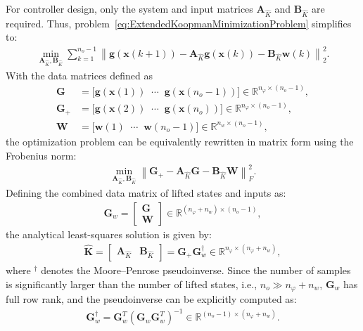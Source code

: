 For controller design, only the system and input matrices $\bm{A}_{\hat{K}}$ and $\bm{B}_{\hat{K}}$ are required. Thus, problem~\eqref{eq:ExtendedKoopmanMinimizationProblem} simplifies to:
\begin{align}
    \min_{\bm{A}_{\hat{K}}, \bm{B}_{\hat{K}}} 
    \sum_{k=1}^{n_o-1} 
    \left\| \bm{g}(\bm{x}(k+1)) - \bm{A}_{\hat{K}} \bm{g}(\bm{x}(k)) - \bm{B}_{\hat{K}} \bm{w}(k) \right\|_2^2.
    \label{eq:ApproxKoopman}
\end{align}
%
With the data matrices defined as
\begin{align}\label{eq:G_Gplus_datamatrices}
    \bm{G} &= \bigl[ \bm{g}(\bm{x}(1)) \;\; \cdots \;\; \bm{g}(\bm{x}(n_o-1)) \bigr] \in \mathbb{R}^{n_\varphi \times (n_o-1)}, \\
    \bm{G}_{+} &= \bigl[ \bm{g}(\bm{x}(2)) \;\; \cdots \;\; \bm{g}(\bm{x}(n_o)) \bigr] \in \mathbb{R}^{n_\varphi \times (n_o-1)}, \\
    \bm{W} &= \bigl[ \bm{w}(1) \;\; \cdots \;\; \bm{w}(n_o-1) \bigr] \in \mathbb{R}^{n_w \times (n_o-1)},
\end{align}
the optimization problem can be equivalently rewritten in matrix form using the Frobenius norm:
\begin{align}
    \min_{\bm{A}_{\hat{K}}, \bm{B}_{\hat{K}}} 
    \left\| \bm{G}_{+} - \bm{A}_{\hat{K}} \bm{G} - \bm{B}_{\hat{K}} \bm{W} \right\|_F^2.
\end{align}
Defining the combined data matrix of lifted states and inputs as:
\begin{align}
    \bm{G}_w = \begin{bmatrix} \bm{G} \\ \bm{W} \end{bmatrix} \in \mathbb{R}^{(n_\varphi + n_w)\times (n_o-1)},
\end{align}
the analytical least-squares solution is given by:
\begin{align}\label{eq:Koop_G_Gplus_datamatrices}
    \hat{\bm{K}} = \begin{bmatrix} \bm{A}_{\hat{K}} & \bm{B}_{\hat{K}} \end{bmatrix} 
    = \bm{G}_{+}  \bm{G}_w^{\dagger}
    \in \mathbb{R}^{n_\varphi \times (n_\varphi + n_w)},
\end{align}
where ${}^\dagger$ denotes the Moore–Penrose pseudoinverse. Since the number of samples is significantly larger than the number of lifted states, i.e., $n_o \gg n_\varphi + n_w$, $\bm{G}_w$ has full row rank, and the pseudoinverse can be explicitly computed as:
\begin{align*}
    \bm{G}_w^{\dagger} = \bm{G}_w^T (\bm{G}_w \bm{G}_w^T)^{-1} \in \mathbb{R}^{(n_o-1) \times (n_\varphi + n_w)}.
\end{align*}
